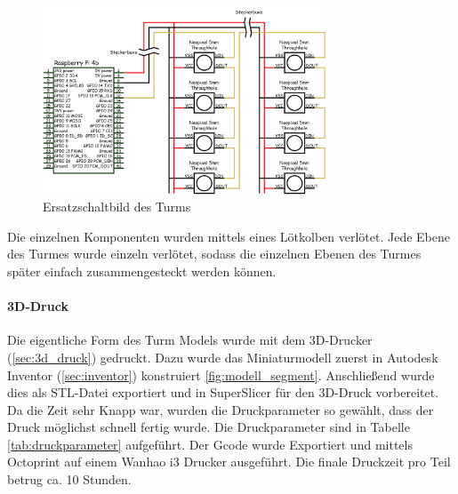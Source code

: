 \begin{figure}[H]
  \centering
  \includegraphics[width=0.75\textwidth]{images/tower_controller_v4_circuit_diagram.png}
  \caption{Ersatzschaltbild des Turms}
  \label{fig:ersatzschaltbild}
\end{figure}

Die einzelnen Komponenten wurden mittels eines Lötkolben verlötet. Jede Ebene des Turmes wurde einzeln verlötet, sodass die einzelnen Ebenen des Turmes später einfach zusammengesteckt werden können.

\paragraph{3D-Druck}

Die eigentliche Form des Turm Models wurde mit dem 3D-Drucker (\ref{sec:3d_druck}) gedruckt. Dazu wurde das Miniaturmodell zuerst in Autodesk Inventor (\ref{sec:inventor}) konstruiert \ref{fig:modell_segment}. Anschließend wurde dies als STL-Datei exportiert und in SuperSlicer für den 3D-Druck vorbereitet. Da die Zeit sehr Knapp war, wurden die Druckparameter so gewählt, dass der Druck möglichst schnell fertig wurde. Die Druckparameter sind in Tabelle \ref{tab:druckparameter} aufgeführt. Der Gcode wurde Exportiert und mittels Octoprint auf einem Wanhao i3 Drucker ausgeführt. Die finale Druckzeit pro Teil betrug ca. 10 Stunden.